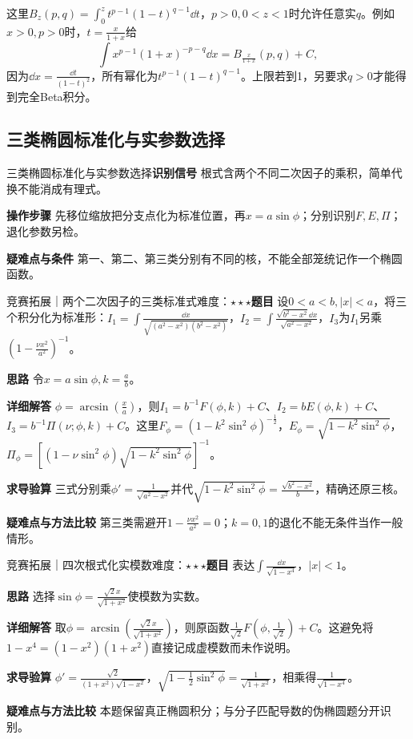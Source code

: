 这里$B_z(p,q)=\int_0^z t^{p-1}(1-t)^{q-1}\dd t$，$p>0,0<z<1$时允许任意实$q$。例如$x>0,p>0$时，$t=\frac{x}{1+x}$给\[\int x^{p-1}(1+x)^{-p-q}\dd x=B_{\frac{x}{1+x}}(p,q)+C,\]因为$\dd x=\frac{\dd t}{(1-t)^2}$，所有幂化为$t^{p-1}(1-t)^{q-1}$。上限若到1，另要求$q>0$才能得到完全Beta积分。

\subsection{三类椭圆标准化与实参数选择}\label{ic:indefinite_special_complete:elliptic}\begin{method}{三类椭圆标准化与实参数选择}\textbf{识别信号} 根式含两个不同二次因子的乘积，简单代换不能消成有理式。\par \textbf{操作步骤} 先移位缩放把分支点化为标准位置，再$x=a\sin\phi$；分别识别$F,E,\Pi$；退化参数另检。\par \textbf{疑难点与条件} 第一、第二、第三类分别有不同的核，不能全部笼统记作一个椭圆函数。\end{method}

\begin{example}{竞赛拓展｜两个二次因子的三类标准式}{难度：$\star\star\star$}\label{ic:ex:indefinite_special_complete:ellipticthree}\textbf{题目} 设$0<a<b,|x|<a$，将三个积分化为标准形：$I_1=\int\frac{\dd x}{\sqrt{(a^2-x^2)(b^2-x^2)}}$，$I_2=\int\frac{\sqrt{b^2-x^2}\dd x}{\sqrt{a^2-x^2}}$，$I_3$为$I_1$另乘$(1-\frac{\nu x^2}{a^2})^{-1}$。\par \textbf{思路} 令$x=a\sin\phi,k=\frac{a}{b}$。\par \textbf{详细解答} $\phi=\arcsin(\frac{x}{a})$，则$I_1=b^{-1}F(\phi,k)+C$、$I_2=bE(\phi,k)+C$、$I_3=b^{-1}\Pi(\nu;\phi,k)+C$。这里$F_\phi=(1-k^2\sin^2\phi)^{-\frac{1}{2}}$，$E_\phi=\sqrt{1-k^2\sin^2\phi}$，$\Pi_\phi=[(1-\nu\sin^2\phi)\sqrt{1-k^2\sin^2\phi}]^{-1}$。\par \textbf{求导验算} 三式分别乘$\phi'=\frac{1}{\sqrt{a^2-x^2}}$并代$\sqrt{1-k^2\sin^2\phi}=\frac{\sqrt{b^2-x^2}}{b}$，精确还原三核。\par \textbf{疑难点与方法比较} 第三类需避开$1-\frac{\nu x^2}{a^2}=0$；$k=0,1$的退化不能无条件当作一般情形。\end{example}

\begin{example}{竞赛拓展｜四次根式化实模数}{难度：$\star\star\star$}\label{ic:ex:indefinite_special_complete:quarticelliptic}\textbf{题目} 表达$\int\frac{\dd x}{\sqrt{1-x^4}}$，$|x|<1$。\par \textbf{思路} 选择$\sin\phi=\frac{\sqrt2x}{\sqrt{1+x^2}}$使模数为实数。\par \textbf{详细解答} 取$\phi=\arcsin(\frac{\sqrt2x}{\sqrt{1+x^2}})$，则原函数$\frac1{\sqrt2}F(\phi,\frac{1}{\sqrt2})+C$。这避免将$1-x^4=(1-x^2)(1+x^2)$直接记成虚模数而未作说明。\par \textbf{求导验算} $\phi'=\frac{\sqrt2}{(1+x^2)\sqrt{1-x^2}}$，$\sqrt{1-\frac12\sin^2\phi}=\frac{1}{\sqrt{1+x^2}}$，相乘得$\frac{1}{\sqrt{1-x^4}}$。\par \textbf{疑难点与方法比较} 本题保留真正椭圆积分；与分子匹配导数的伪椭圆题分开识别。\end{example}

